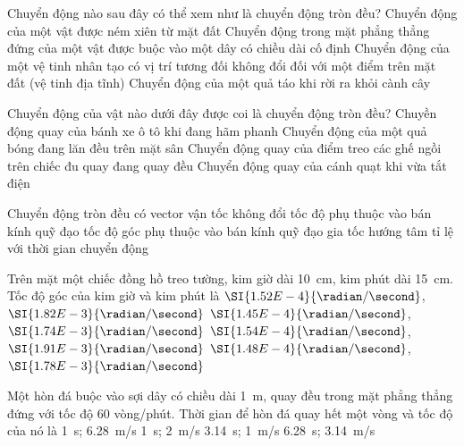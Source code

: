 \begin{ex}
	Chuyển động nào sau đây có thể xem như là chuyển động tròn đều?
	\choice
	{Chuyển động của một vật được ném xiên từ mặt đất}
	{Chuyển động trong mặt phẳng thẳng đứng của một vật được buộc vào một dây có chiều dài cố định}
	{\True Chuyển động của một vệ tinh nhân tạo có vị trí tương đối không đổi đối với một điểm trên mặt đất (vệ tinh địa tĩnh)}
	{Chuyển động của một quả táo khi rời ra khỏi cành cây}
	\loigiai{}
\end{ex}
\begin{ex}
	Chuyển động của vật nào dưới đây được coi là chuyển động tròn đều?
	\choice
	{Chuyền động quay của bánh xe ô tô khi đang hãm phanh}
	{Chuyển động của một quả bóng đang lăn đều trên mặt sân}
	{\True Chuyển động quay của điểm treo các ghế ngồi trên chiếc đu quay đang quay đều}
	{Chuyển động quay của cánh quạt khi vừa tắt điện}
	\loigiai{}
\end{ex}
\begin{ex}
	Chuyển động tròn đều có
	\choice
	{vector vận tốc không đổi}
	{\True tốc độ phụ thuộc vào bán kính quỹ đạo}
	{tốc độ góc phụ thuộc vào bán kính quỹ đạo}
	{gia tốc hướng tâm tỉ lệ với thời gian chuyển động}
	\loigiai{}
\end{ex}
\begin{ex}
	Trên mặt một chiếc đồng hồ treo tường, kim giờ dài \SI{10}{\centi\meter}, kim phút dài \SI{15}{\centi\meter}. Tốc độ góc của kim giờ và kim phút là
	\choice
	{$\SI{1.52E-4}{\radian/\second}$, $\SI{1.82E-3}{\radian/\second}$}
	{\True $\SI{1.45E-4}{\radian/\second}$, $\SI{1.74E-3}{\radian/\second}$}
	{$\SI{1.54E-4}{\radian/\second}$, $\SI{1.91E-3}{\radian/\second}$}
	{$\SI{1.48E-4}{\radian/\second}$, $\SI{1.78E-3}{\radian/\second}$}
	\loigiai{}
\end{ex}
\begin{ex}
	Một hòn đá buộc vào sợi dây có chiều dài \SI{1}{\meter}, quay đều trong mặt phẳng thẳng đứng với tốc độ 60 vòng/phút. Thời gian để hòn đá quay hết một vòng và tốc độ của nó là
	\choice
	{\True \SI{1}{\second}; \SI{6.28}{\meter/\second}}
	{\SI{1}{\second}; \SI{2}{\meter/\second}}
	{\SI{3.14}{\second}; \SI{1}{\meter/\second}}
	{\SI{6.28}{\second}; \SI{3.14}{\meter/\second}}
	\loigiai{}
\end{ex}
